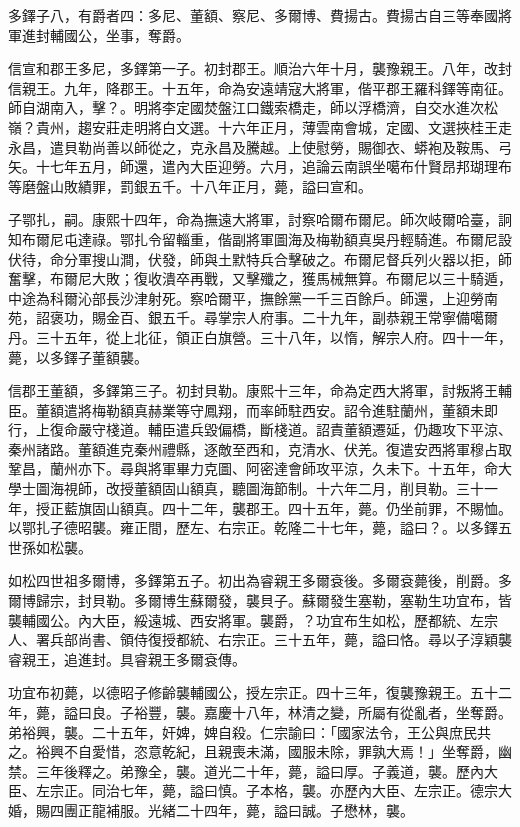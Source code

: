 \begin{pinyinscope}
多鐸子八，有爵者四：多尼、董額、察尼、多爾博、費揚古。費揚古自三等奉國將軍進封輔國公，坐事，奪爵。

信宣和郡王多尼，多鐸第一子。初封郡王。順治六年十月，襲豫親王。八年，改封信親王。九年，降郡王。十五年，命為安遠靖寇大將軍，偕平郡王羅科鐸等南征。師自湖南入，擊？。明將李定國焚盤江口鐵索橋走，師以浮橋濟，自交水進次松嶺？貴州，趨安莊走明將白文選。十六年正月，薄雲南會城，定國、文選挾桂王走永昌，遣貝勒尚善以師從之，克永昌及騰越。上使慰勞，賜御衣、蟒袍及鞍馬、弓矢。十七年五月，師還，遣內大臣迎勞。六月，追論云南誤坐噶布什賢昂邦瑚理布等磨盤山敗績罪，罰銀五千。十八年正月，薨，謚曰宣和。

子鄂扎，嗣。康熙十四年，命為撫遠大將軍，討察哈爾布爾尼。師次岐爾哈臺，詗知布爾尼屯達祿。鄂扎令留輜重，偕副將軍圖海及梅勒額真吳丹輕騎進。布爾尼設伏待，命分軍搜山澗，伏發，師與土默特兵合擊破之。布爾尼督兵列火器以拒，師奮擊，布爾尼大敗；復收潰卒再戰，又擊殲之，獲馬械無算。布爾尼以三十騎遁，中途為科爾沁部長沙津射死。察哈爾平，撫餘黨一千三百餘戶。師還，上迎勞南苑，詔褒功，賜金百、銀五千。尋掌宗人府事。二十九年，副恭親王常寧備噶爾丹。三十五年，從上北征，領正白旗營。三十八年，以惰，解宗人府。四十一年，薨，以多鐸子董額襲。

信郡王董額，多鐸第三子。初封貝勒。康熙十三年，命為定西大將軍，討叛將王輔臣。董額遣將梅勒額真赫業等守鳳翔，而率師駐西安。詔令進駐蘭州，董額未即行，上復命嚴守棧道。輔臣遣兵毀偏橋，斷棧道。詔責董額遷延，仍趣攻下平涼、秦州諸路。董額進克秦州禮縣，逐敵至西和，克清水、伏羌。復遣安西將軍穆占取鞏昌，蘭州亦下。尋與將軍畢力克圖、阿密達會師攻平涼，久未下。十五年，命大學士圖海視師，改授董額固山額真，聽圖海節制。十六年二月，削貝勒。三十一年，授正藍旗固山額真。四十二年，襲郡王。四十五年，薨。仍坐前罪，不賜恤。以鄂扎子德昭襲。雍正間，歷左、右宗正。乾隆二十七年，薨，謚曰？。以多鐸五世孫如松襲。

如松四世祖多爾博，多鐸第五子。初出為睿親王多爾袞後。多爾袞薨後，削爵。多爾博歸宗，封貝勒。多爾博生蘇爾發，襲貝子。蘇爾發生塞勒，塞勒生功宜布，皆襲輔國公。內大臣，綏遠城、西安將軍。襲爵，？功宜布生如松，歷都統、左宗人、署兵部尚書、領侍復授都統、右宗正。三十五年，薨，謚曰恪。尋以子淳穎襲睿親王，追進封。具睿親王多爾袞傳。

功宜布初薨，以德昭子修齡襲輔國公，授左宗正。四十三年，復襲豫親王。五十二年，薨，謚曰良。子裕豐，襲。嘉慶十八年，林清之變，所屬有從亂者，坐奪爵。弟裕興，襲。二十五年，奸婢，婢自殺。仁宗諭曰：「國家法令，王公與庶民共之。裕興不自愛惜，恣意乾紀，且親喪未滿，國服未除，罪孰大焉！」坐奪爵，幽禁。三年後釋之。弟豫全，襲。道光二十年，薨，謚曰厚。子義道，襲。歷內大臣、左宗正。同治七年，薨，謚曰慎。子本格，襲。亦歷內大臣、左宗正。德宗大婚，賜四團正龍補服。光緒二十四年，薨，謚曰誠。子懋林，襲。


\end{pinyinscope}
